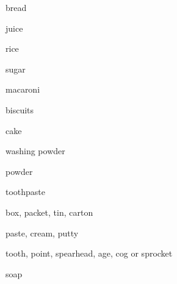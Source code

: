 \begin{flashcard}{\LARGE bread}
\LARGE {}
\end{flashcard}
\begin{flashcard}{\LARGE juice}
\LARGE {}
\end{flashcard}
\begin{flashcard}{\LARGE rice}
\LARGE {}
\end{flashcard}
\begin{flashcard}{\LARGE sugar}
\LARGE {}
\end{flashcard}
\begin{flashcard}{\LARGE macaroni}
\LARGE {}
\end{flashcard}
\begin{flashcard}{\LARGE biscuits}
\LARGE {}
\end{flashcard}
\begin{flashcard}{\LARGE cake}
\LARGE {}
\end{flashcard}
\begin{flashcard}{\LARGE washing powder}
\LARGE {}
\end{flashcard}
\begin{flashcard}{\LARGE powder}
\LARGE {}
\end{flashcard}
\begin{flashcard}{\LARGE toothpaste}
\LARGE {}
\end{flashcard}
\begin{flashcard}{\LARGE box, packet, tin, carton}
\LARGE {}
\end{flashcard}
\begin{flashcard}{\LARGE paste, cream, putty}
\LARGE {}
\end{flashcard}
\begin{flashcard}{\LARGE tooth, point, spearhead, age, cog or sprocket}
\LARGE {}
\end{flashcard}
\begin{flashcard}{\LARGE soap}
\LARGE {}
\end{flashcard}
